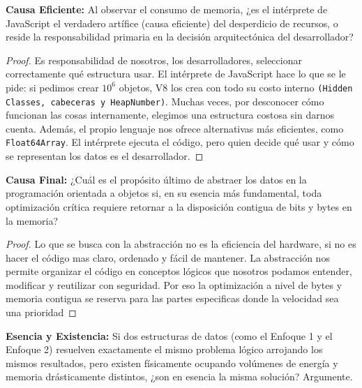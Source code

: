 \documentclass[11pt]{article}
\begin{document}
\begin{ejer}
    \textbf{Causa Eficiente:} Al observar el consumo de memoria, ¿es el intérprete de JavaScript el verdadero artífice (causa eficiente) del desperdicio de recursos, o reside la responsabilidad primaria en la decisión arquitectónica del desarrollador?
\end{ejer}

\begin{proof}\hspace{0pt}    
    Es responsabilidad de nosotros, los desarrolladores, seleccionar correctamente qué estructura usar. El intérprete de JavaScript hace lo que se le pide: si pedimos crear $10^6$ objetos, V8 los crea con todo su costo interno \texttt{(Hidden Classes, cabeceras y HeapNumber)}. Muchas veces, por desconocer cómo funcionan las cosas internamente, elegimos una estructura costosa sin darnos cuenta. Además, el propio lenguaje nos ofrece alternativas más eficientes, como \texttt{Float64Array}. El intérprete ejecuta el código, pero quien decide qué usar y cómo se representan los datos es el desarrollador.
\end{proof}

\begin{ejer}
    \textbf{Causa Final:} ¿Cuál es el propósito último de abstraer los datos en la programación orientada a objetos si, en su esencia más fundamental, toda optimización crítica requiere retornar a la disposición contigua de bits y bytes en la memoria?
\end{ejer}

\begin{proof}\hspace{0pt}
   Lo que se busca con la abstracción no es la eficiencia del hardware, si no es hacer el código mas claro, ordenado y fácil de mantener. La abstracción nos permite organizar el código en conceptos lógicos que nosotros podamos entender, modificar y reutilizar con seguridad. Por eso la optimización a nivel de bytes y memoria contigua se reserva para las partes especificas donde la velocidad sea una prioridad 
\end{proof}

\begin{ejer}
    \textbf{Esencia y Existencia:} Si dos estructuras de datos (como el Enfoque 1 y el Enfoque 2) resuelven exactamente el mismo problema lógico arrojando los mismos resultados, pero existen físicamente ocupando volúmenes de energía y memoria drásticamente distintos, ¿son en esencia la misma solución? Argumente.
\end{ejer}
\end{document}
